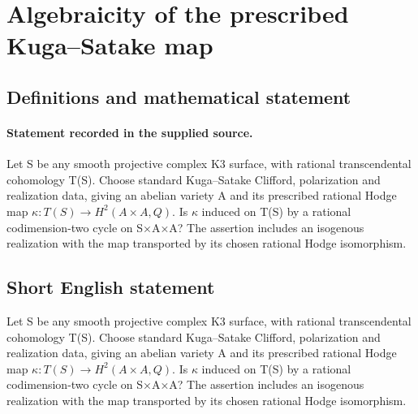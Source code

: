\documentclass[11pt]{article}
\begin{document}
\section*{Algebraicity of the prescribed Kuga–Satake map}\label{statement}
\subsection{Definitions and mathematical statement}
\paragraph{Statement recorded in the supplied source.}
Let S be any smooth projective complex K3 surface, with rational transcendental cohomology T(S). Choose standard Kuga–Satake Clifford, polarization and realization data, giving an abelian variety A and its prescribed rational Hodge map $\kappa :T(S)\to H^{2}(A×A,Q)$. Is $\kappa $ induced on T(S) by a rational codimension-two cycle on S×A×A? The assertion includes an isogenous realization with the map transported by its chosen rational Hodge isomorphism.
\subsection{Short English statement}
Let S be any smooth projective complex K3 surface, with rational transcendental cohomology T(S). Choose standard Kuga–Satake Clifford, polarization and realization data, giving an abelian variety A and its prescribed rational Hodge map $\kappa :T(S)\to H^{2}(A×A,Q)$. Is $\kappa $ induced on T(S) by a rational codimension-two cycle on S×A×A? The assertion includes an isogenous realization with the map transported by its chosen rational Hodge isomorphism.
\end{document}
